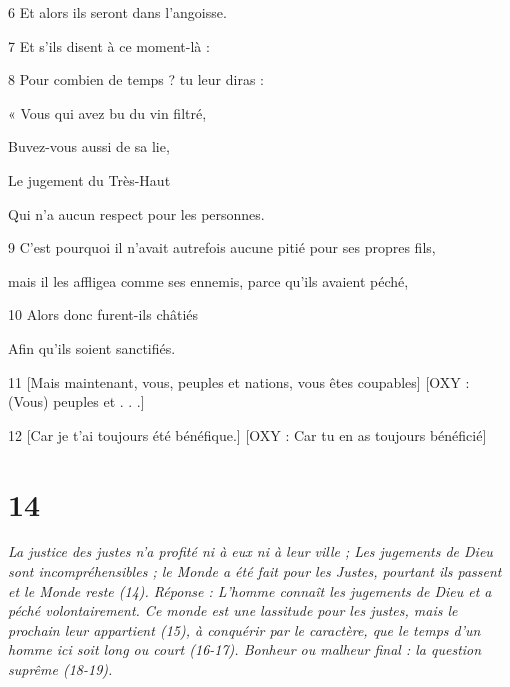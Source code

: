 \par 6 Et alors ils seront dans l'angoisse.

\par 7 Et s'ils disent à ce moment-là :

\par 8 Pour combien de temps ? tu leur diras :

\par « Vous qui avez bu du vin filtré,

\par Buvez-vous aussi de sa lie,

\par Le jugement du Très-Haut

\par Qui n'a aucun respect pour les personnes.

\par 9 C'est pourquoi il n'avait autrefois aucune pitié pour ses propres fils,

\par mais il les affligea comme ses ennemis, parce qu'ils avaient péché,

\par 10 Alors donc furent-ils châtiés

\par Afin qu'ils soient sanctifiés.

\par 11 [Mais maintenant, vous, peuples et nations, vous êtes coupables] [OXY : (Vous) peuples et . . .]

\par [Parce que vous avez toujours foulé la terre,] [OXY : (Vous) avez foulé la terre]

\par [Et a utilisé injustement la création.] [OXY : Et a abusé des choses créées en elle.]

\par 12 [Car je t'ai toujours été bénéfique.] [OXY : Car tu en as toujours bénéficié]

\par [Et tu as toujours été ingrat pour la bienfaisance.] [OXY : Mais tu as toujours été ingrat.]

\chapter{14}

\par \textit{La justice des justes n'a profité ni à eux ni à leur ville ; Les jugements de Dieu sont incompréhensibles ; le Monde a été fait pour les Justes, pourtant ils passent et le Monde reste (14). Réponse : L'homme connaît les jugements de Dieu et a péché volontairement. Ce monde est une lassitude pour les justes, mais le prochain leur appartient (15), à conquérir par le caractère, que le temps d'un homme ici soit long ou court (16-17). Bonheur ou malheur final : la question suprême (18-19).}

